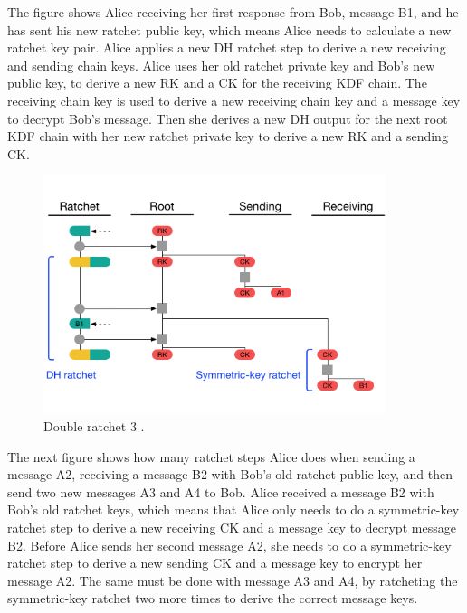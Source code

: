 The figure shows Alice receiving her first response from Bob, message
B1, and he has sent his new ratchet public key, which means Alice needs
to calculate a new ratchet key pair. Alice applies a new DH ratchet step to
derive a new receiving and sending chain keys. Alice uses her old ratchet
private key and Bob’s new public key, to derive a new RK and a CK for
the receiving KDF chain. The receiving chain key is used to derive a new
receiving chain key and a message key to decrypt Bob’s message. Then she
derives a new DH output for the next root KDF chain with her new ratchet
private key to derive a new RK and a sending CK.

\begin{figure}[H]
	\centering
	\includegraphics[width=10cm]{figures/doubleratchet3.png}
	\caption{Double ratchet 3 \cite{doubleratchet}.}
	\label{fig:doubleratchet3}
\end{figure}

The next figure shows how many ratchet steps Alice does when
sending a message A2, receiving a message B2 with Bob’s old ratchet public
key, and then send two new messages A3 and A4 to Bob. Alice received
a message B2 with Bob’s old ratchet keys, which means that Alice only
needs to do a symmetric-key ratchet step to derive a new receiving CK
and a message key to decrypt message B2. Before Alice sends her second
message A2, she needs to do a symmetric-key ratchet step to derive a new
sending CK and a message key to encrypt her message A2. The same must
be done with message A3 and A4, by ratcheting the symmetric-key ratchet
two more times to derive the correct message keys.

